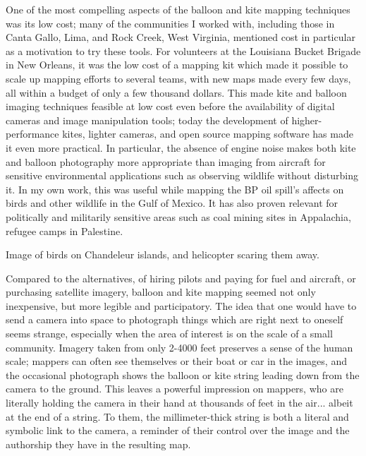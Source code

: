 \documentclass[11pt,oneside,notitlepage]{report}
\begin{document}

One of the most compelling aspects of the balloon and kite mapping techniques was its low cost; many of the communities I worked with, including those in Canta Gallo, Lima, and Rock Creek, West Virginia, mentioned cost in particular as a motivation to try these tools. For volunteers at the Louisiana Bucket Brigade in New Orleans, it was the low cost of a mapping kit which made it possible to scale up mapping efforts to several teams, with new maps made every few days, all within a budget of only a few thousand dollars. This made kite and balloon imaging techniques feasible at low cost even before the availability of digital cameras and image manipulation tools; today the development of higher-performance kites, lighter cameras, and open source mapping software has made it even more practical. In particular, the absence of engine noise makes both kite and balloon photography more appropriate than imaging from aircraft for sensitive environmental applications such as observing wildlife without disturbing it. \cite{aber1999kite} In my own work, this was useful while mapping the BP oil spill's affects on birds and other wildlife in the Gulf of Mexico. It has also proven relevant for politically and militarily sensitive areas such as coal mining sites in Appalachia, refugee camps in Palestine.

Image of birds on Chandeleur islands, and helicopter scaring them away.  

Compared to the alternatives, of hiring pilots and paying for fuel and aircraft, or purchasing satellite imagery, balloon and kite mapping seemed not only inexpensive, but more legible and participatory. The idea that one would have to send a camera into space to photograph things which are right next to oneself seems strange, especially when the area of interest is on the scale of a small community. Imagery taken from only 2-4000 feet preserves a sense of the human scale; mappers can often see themselves or their boat or car in the images, and the occasional photograph shows the balloon or kite string leading down from the camera to the ground. This leaves a powerful impression on mappers, who are literally holding the camera in their hand at thousands of feet in the air... albeit at the end of a string. To them, the millimeter-thick string is both a literal and symbolic link to the camera, a reminder of their control over the image and the authorship they have in the resulting map.  
\end{document}
